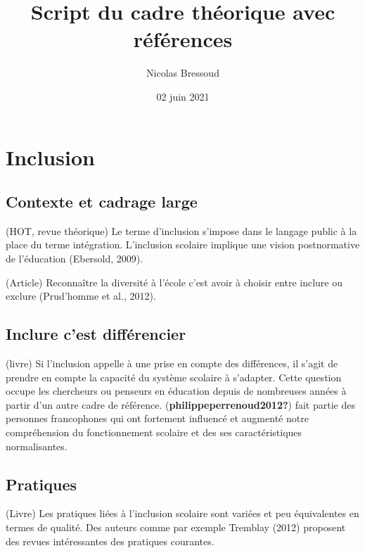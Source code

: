 \documentclass[
  french,
]{article}
\title{Script du cadre théorique avec références}
\author{Nicolas Bressoud}
\date{02 juin 2021}
\begin{document}
\maketitle

\renewcommand*\contentsname{Table des matières}
{
\setcounter{tocdepth}{2}
\tableofcontents
}
\hypertarget{inclusion}{%
\section{Inclusion}\label{inclusion}}

\hypertarget{contexte-et-cadrage-large}{%
\subsection{Contexte et cadrage large}\label{contexte-et-cadrage-large}}

(HOT, revue théorique) Le terme d'inclusion s'impose dans le langage public à la place du terme intégration. L'inclusion scolaire implique une vision postnormative de l'éducation (Ebersold, 2009).

(Article) Reconnaître la diversité à l'école c'est avoir à choisir entre inclure ou exclure (Prud'homme et al., 2012).

\hypertarget{inclure-cest-diffuxe9rencier}{%
\subsection{Inclure c'est différencier}\label{inclure-cest-diffuxe9rencier}}

(livre) Si l'inclusion appelle à une prise en compte des différences, il s'agit de prendre en compte la capacité du système scolaire à s'adapter. Cette question occupe les chercheurs ou penseurs en éducation depuis de nombreuses années à partir d'un autre cadre de référence. (\textbf{philippeperrenoud2012?}) fait partie des personnes francophones qui ont fortement influencé et augmenté notre compréhension du fonctionnement scolaire et des ses caractéristiques normalisantes.

\hypertarget{pratiques}{%
\subsection{Pratiques}\label{pratiques}}

(Livre) Les pratiques liées à l'inclusion scolaire sont variées et peu équivalentes en termes de qualité. Des auteurs comme par exemple Tremblay (2012) proposent des revues intéressantes des pratiques courantes.
\end{document}
